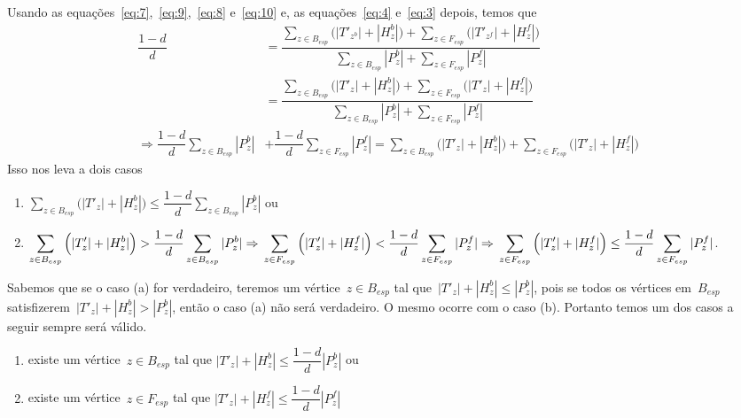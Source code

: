 	Usando as equações~\ref{eq:7},~\ref{eq:9},~\ref{eq:8} e~\ref{eq:10}
	e, as equações~\ref{eq:4} e~\ref{eq:3} depois, temos que
	\begin{align}
		\dfrac{1-d}{d} &= 
		\dfrac{
			\displaystyle\sum_{z\in B_{esp}}
			\Big(|T'_{z^b}|+|H_z^b|\Big) + 
			\displaystyle\sum_{z\in F_{esp}}
			\Big(|T'_{z^f}|+|H_z^f|\Big)}
			{\displaystyle\sum_{z\in B_{esp}}|P_z^b| +
			\displaystyle\sum_{z\in F_{esp}}|P_z^f|}
			\nonumber\\
		&= \dfrac{
			\displaystyle\sum_{z\in B_{esp}}
			\Big(|T'_{z}|+|H_z^b|\Big) + 
			\displaystyle\sum_{z\in F_{esp}}
			\Big(|T'_{z}|+|H_z^f|\Big)}
			{\displaystyle\sum_{z\in B_{esp}}|P_z^b| +
			\displaystyle\sum_{z\in F_{esp}}|P_z^f|}
			\nonumber \\
			\Rightarrow	
			\dfrac{1-d}{d}\displaystyle\sum_{z\in B_{esp}}|P_z^b| &+ 
			\dfrac{1-d}{d}\displaystyle\sum_{z\in F_{esp}}|P_z^f|
			= \displaystyle\sum_{z\in B_{esp}}
			\Big(|T'_{z}|+|H_z^b|\Big) + 
			\displaystyle\sum_{z\in F_{esp}}
			\Big(|T'_{z}|+|H_z^f|\Big)\nonumber
	\end{align}
	Isso nos leva a dois casos
	\begin{enumerate}[label=(\alph*)]
		\item $\displaystyle\sum_{z\in B_{esp}}
			\Big(|T'_{z}|+|H_z^b|\Big)\le
			\dfrac{1-d}{d}\displaystyle\sum_{z\in B_{esp}}|P_z^b|$
			ou
		\item $\displaystyle\sum_{z\in B_{esp}}
			\Big(|T'_{z}|+|H_z^b|\Big)>
			\dfrac{1-d}{d}\displaystyle\sum_{z\in B_{esp}}|P_z^b|
			\Rightarrow \\
			\displaystyle\sum_{z\in F_{esp}}
			\Big(|T'_{z}|+|H_z^f|\Big)<
			\dfrac{1-d}{d}\displaystyle\sum_{z\in F_{esp}}|P_z^f|
			\Rightarrow \\
			\displaystyle\sum_{z\in F_{esp}}
			\Big(|T'_{z}|+|H_z^f|\Big)\le
			\dfrac{1-d}{d}\displaystyle\sum_{z\in F_{esp}}|P_z^f|$.
	\end{enumerate}

	Sabemos que se o caso (a) for verdadeiro, teremos um 
	vértice~$z\in B_{esp}$ tal que~${|T'_z|+|H^b_z|\le |P^b_z|}$,
	pois se todos os vértices em~$B_{esp}$ 
	satisfizerem~${|T'_z|+|H^b_z| > |P^b_z|}$, então o caso (a)
	não será verdadeiro.
	O mesmo ocorre com o caso (b). 
	Portanto temos um dos casos
	a seguir sempre será válido.

	\begin{enumerate}[label=(\alph*)]
		\item existe um vértice~$z\in B_{esp}$ 
			tal que $|T'_{z}|+|H_z^b|\le
			\dfrac{1-d}{d}|P_z^b|$ ou
		\item existe um vértice~$z\in F_{esp}$ 
			tal que $|T'_{z}|+|H_z^f|\le
			\dfrac{1-d}{d}|P_z^f|$
	\end{enumerate}

